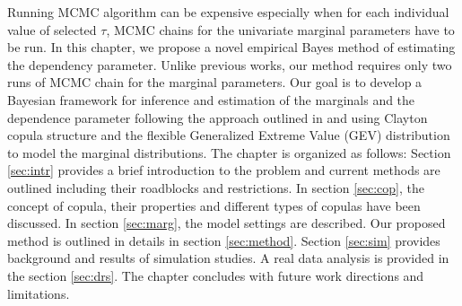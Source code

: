 \documentclass[11pt]{article}
\theoremstyle{remboldstyle}
\begin{document}
Running MCMC algorithm can be expensive especially when for each individual value of selected $\tau$, MCMC chains for the univariate marginal parameters have to be run. In this chapter, we propose a novel empirical Bayes method of estimating the dependency parameter. Unlike previous works, our method requires only two runs of MCMC chain for the marginal parameters. Our goal is to develop a Bayesian framework for inference and estimation of the marginals and the dependence parameter following the approach outlined in \cite{doss:2010} and \cite{roy:2014} using Clayton copula structure and the flexible Generalized Extreme Value (GEV) distribution to model the marginal distributions. The chapter is organized as follows: Section \ref{sec:intr} provides a brief introduction to the problem and current methods are outlined including their roadblocks and restrictions. In section \ref{sec:cop}, the concept of copula, their properties and different types of copulas have been discussed. In section \ref{sec:marg}, the model settings are described. Our proposed method is outlined in details in section \ref{sec:method}. Section \ref{sec:sim} provides background and results of simulation studies. A real data analysis is provided in the section \ref{sec:drs}. The chapter concludes with future work directions and limitations.
\end{document}
